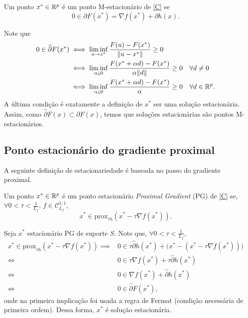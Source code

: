 \begin{definition}
    Um ponto $x^*\in\mathbb{R}^p$ é um ponto M-estacionário de \eqref{C} se
    \[0\in \partial F(x^*)=\nabla f(x^*)+\partial h(x).\]
\end{definition}

Note que
\begin{align*}
0 \in \widehat{\partial} F(x^*) &\iff \liminf_{u \to x^*} \frac{F(u) - F(x^*)}{\|u - x^*\|} \geq 0 \\
&\iff \liminf_{\alpha \downarrow 0} \frac{F(x^* + \alpha d) - F(x^*)}{\alpha \|d\|} \geq 0 \quad \forall d\neq 0 \\
&\iff \liminf_{\alpha \downarrow 0} \frac{F(x^* + \alpha d) - F(x^*)}{\alpha} \geq 0 \quad \forall d\in\mathbb{R}^p.
\end{align*}
A última condição é exatamente a definição de $ x^* $ ser uma solução estacionária. Assim, como $\widehat{\partial} F(x) \subset \partial F(x)$, temos que soluções estacionárias são pontos M-estacionários.

\subsection{Ponto estacionário do gradiente proximal}
A seguinte definição de estacionariedade é baseada no passo do gradiente proximal.

\begin{definition}
    Um ponto $x^*\in\mathbb{R}^p$ é um ponto estacionário \textit{Proximal Gradient} (PG) de \eqref{C} se, $\forall 0<\tau<\frac{1}{L_f}$, $f\in \mathcal{C}_{L_f}^{1,1}$,
    \[x^* \in \mathrm{prox}_{\tau h}(x^* - \tau \nabla f(x^*)).\]
\end{definition}

Seja $x^*$ estacionário PG de suporte $S$. Note que, $\forall 0<\tau<\frac{1}{L_f}$,
\[\begin{aligned}
x^* \in \mathrm{prox}_{\tau h}(x^* - \tau \nabla f(x^*))\implies & 0 \in \tau \widehat{\partial} h(x^*) + \big(x^* - (x^* - \tau \nabla f(x^*))\big) \\
\iff & 0 \in \tau \nabla f(x^*) + \tau \widehat{\partial} h(x^*) \\
\iff & 0 \in \nabla f(x^*) + \widehat{\partial} h(x^*) \\
\iff & 0 \in \widehat{\partial} F(x^*),
\end{aligned}\]
onde na primeira implicação foi usada a regra de Fermat (condição necessária de primeira ordem). Dessa forma, $x^*$ é solução estacionária. 

